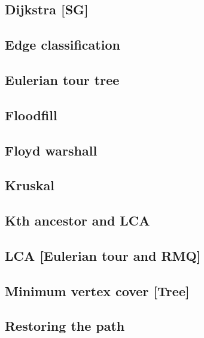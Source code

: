 \subsection{Dijkstra [SG]}
\raggedbottom
\hrulefill
\subsection{Edge classification}
\raggedbottom
\hrulefill
\subsection{Eulerian tour tree}
\raggedbottom
\hrulefill
\subsection{Floodfill}
\raggedbottom
\hrulefill
\subsection{Floyd warshall}
\raggedbottom
\hrulefill
\subsection{Kruskal}
\raggedbottom
\hrulefill
\subsection{Kth ancestor and LCA}
\raggedbottom
\hrulefill
\subsection{LCA [Eulerian tour and RMQ]}
\raggedbottom
\hrulefill
\subsection{Minimum vertex cover [Tree]}
\raggedbottom
\hrulefill
\subsection{Restoring the path}
\raggedbottom
\hrulefill
